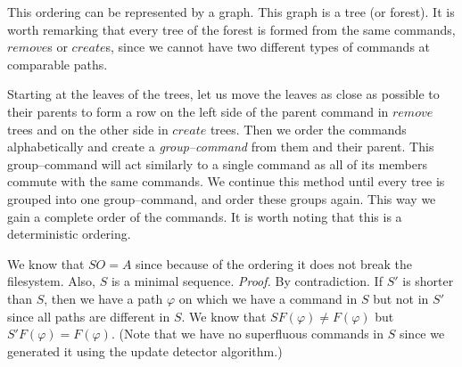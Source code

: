 This ordering can be represented by a graph. This graph is a tree (or
forest). It is worth remarking that every tree of the forest is formed
from the same commands, \(remove\)s or \(create\)s, since 
we cannot have two different
types of commands at comparable paths. 

Starting at the leaves of the trees, let us move the leaves as close as
possible to their parents to form a row on the left side of the
parent command in \(remove\) trees and on the other side in
\(create\) trees. Then we order the commands alphabetically and create a
\emph{group--command} from them and their parent. This
group--command
will act similarly to a single command as all of its members commute with the
same commands. We continue this method until every tree is
grouped into one group--command, and order these groups again.
This way we gain a complete order of the commands. It is worth noting that
this is a deterministic ordering.

We know that \(SO=A\) since because of the ordering it does not break the
filesystem. Also, \(S\) is a minimal sequence. \emph{Proof.} 
By contradiction.
If \(S'\) is shorter than \(S\), then we have a path \(\varphi\) on which
we have a command in \(S\) but not in \(S'\) since all paths are different
in \(S\). We know that \(SF(\varphi)\ne F(\varphi)\) but 
\(S'F(\varphi)=F(\varphi)\). (Note that we have no superfluous commands
in \(S\) since we generated it using the update detector algorithm.)

